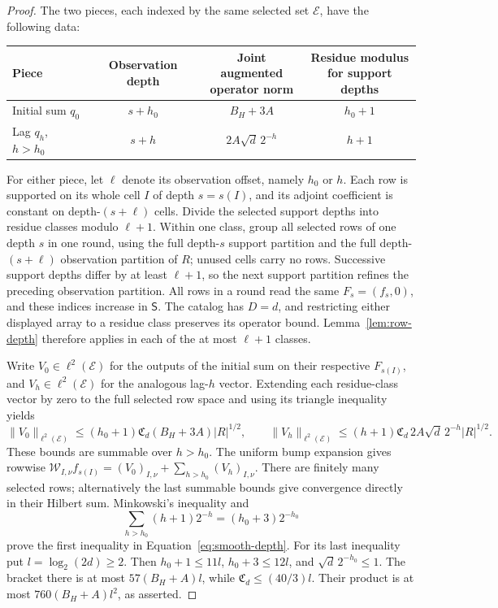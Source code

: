 \begin{proof}
The two pieces, each indexed by the same selected set $\mathcal E$, have
the following data:
\begin{center}
\small
\begin{tabular}{@{}lccc@{}}
\hline
Piece & Observation depth & \shortstack{Joint augmented\\operator norm}
& \shortstack{Residue modulus\\for support depths}\\
\hline
Initial sum $q_0$ & $s+h_0$ & $B_H+3A$ & $h_0+1$\\
Lag $q_h$, $h>h_0$ & $s+h$ & $2A\sqrt d\,2^{-h}$ & $h+1$\\
\hline
\end{tabular}
\end{center}
For either piece, let $\ell$ denote its observation offset, namely $h_0$
or $h$.  Each row is supported on its whole cell $I$ of depth $s=s(I)$,
and its adjoint coefficient is constant on depth-$(s+\ell)$ cells.
Divide the selected support depths into residue classes modulo $\ell+1$.
Within one class, group all selected rows of one depth $s$ in one round,
using the full depth-$s$ support partition and the full depth-$(s+\ell)$
observation partition of $R$; unused cells carry no rows.  Successive
support depths differ by at least $\ell+1$, so the next support partition
refines the preceding observation partition.  All rows in a round read
the same $F_s=(f_s,0)$, and these indices increase in $\mathsf S$.
The catalog has $D=d$, and restricting either displayed array to a
residue class preserves its operator bound.  Lemma~\ref{lem:row-depth}
therefore applies in each of the at most $\ell+1$ classes.

Write $V_0\in\ell^2(\mathcal E)$ for the outputs of the initial sum on
their respective $F_{s(I)}$, and $V_h\in\ell^2(\mathcal E)$ for the
analogous lag-$h$ vector.  Extending each residue-class vector by zero
to the full selected row space and using its triangle inequality yields
\[
 \|V_0\|_{\ell^2(\mathcal E)}
 \le (h_0+1)\mathfrak C_d(B_H+3A)|R|^{1/2},
 \qquad
 \|V_h\|_{\ell^2(\mathcal E)}
 \le (h+1)\mathfrak C_d\,2A\sqrt d\,2^{-h}|R|^{1/2}.
\]
These bounds are summable over $h>h_0$.  The uniform bump
expansion gives rowwise
$\mathcal W_{I,\nu}f_{s(I)}
= (V_0)_{I,\nu}+\sum_{h>h_0}(V_h)_{I,\nu}$.
There are finitely many selected rows; alternatively the last
summable bounds give convergence directly in their Hilbert
sum.  Minkowski's inequality and
\[
 \sum_{h>h_0}(h+1)2^{-h}=(h_0+3)2^{-h_0}
\]
prove the first inequality in Equation~\eqref{eq:smooth-depth}.
For its last inequality put $l=\log_2(2d)\ge2$.  Then
$h_0+1\le11l$, $h_0+3\le12l$, and
$\sqrt d\,2^{-h_0}\le1$.  The bracket there is at most
$57(B_H+A)l$, while
$\mathfrak C_d\le(40/3)l$.  Their product is at most
$760(B_H+A)l^2$, as asserted.
\end{proof}

